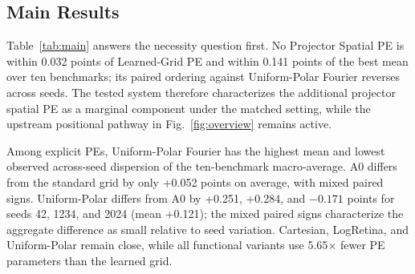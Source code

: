 \documentclass{article}
\begin{document}
\subsection{Main Results}

\begin{table}[!t]
\centering
\caption{Matched 312-step results over three seeds (\%). A0 is
an initialization diagnostic; all rows share exposure, horizon,
and evaluation.}
\label{tab:main}
\setlength{\tabcolsep}{3.5pt}
\end{table}

Table~\ref{tab:main} answers the necessity question first. No
Projector Spatial PE is within 0.032 points of Learned-Grid PE
and within 0.141 points of the best mean over ten benchmarks;
its paired ordering against Uniform-Polar Fourier reverses
across seeds. The tested system therefore characterizes the additional
projector spatial PE as a marginal component under the matched
setting, while the upstream positional pathway in Fig.~\ref{fig:overview} remains active.

Among explicit PEs, Uniform-Polar Fourier has the highest mean and lowest observed across-seed dispersion of the ten-benchmark macro-average. A0 differs from
the standard grid by only +0.052 points on average, with mixed
paired signs.
Uniform-Polar differs from A0 by +0.251, +0.284, and
$-0.171$ points for seeds 42, 1234, and 2024
(mean +0.121); the mixed paired signs characterize the
aggregate difference as small relative to seed variation.
Cartesian, LogRetina, and Uniform-Polar remain close, while all
functional variants use 5.65$\times$ fewer PE parameters than
the learned grid.
\end{document}

